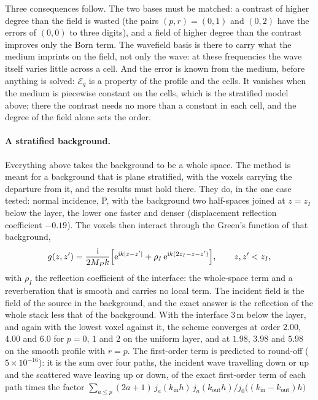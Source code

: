 \documentclass[11pt,a4paper]{article}
\begin{document}
Three consequences follow. The two bases must be matched: a contrast of higher degree than the field is
wasted (the pairs $(p,r)=(0,1)$ and $(0,2)$ have the errors of $(0,0)$ to three digits), and a field of
higher degree than the contrast improves only the Born term. The wavefield basis is there to carry what
the medium imprints on the field, not only the wave: at these frequencies the wave itself varies little
across a cell. And the error is known from the medium, before anything is solved: $\mathcal{E}_q$ is a
property of the profile and the cells. It vanishes when the medium is piecewise constant on the cells,
which is the stratified model above; there the contrast needs no more than a constant in each cell, and
the degree of the field alone sets the order.

\paragraph{A stratified background.} Everything above takes the background to be a whole space. The
method is meant for a background that is plane stratified, with the voxels carrying the departure from
it, and the results must hold there. They do, in the one case tested: normal incidence, P, with the
background two half-spaces joined at $z=z_I$ below the layer, the lower one faster and denser
(displacement reflection coefficient $-0.19$). The voxels then interact through the Green's function
of that background,
\begin{equation}\label{eq:gstrat}
  g(z,z')=\frac{\mathrm{i}}{2M_Pk}\Bigl[\mathrm{e}^{\mathrm{i}k|z-z'|}
          +\rho_I\,\mathrm{e}^{\mathrm{i}k(2z_I-z-z')}\Bigr],\qquad z,z'<z_I,
\end{equation}
with $\rho_I$ the reflection coefficient of the interface: the whole-space term and a reverberation
that is smooth and carries no local term. The incident field is the field of the source in the
background, and the exact answer is the reflection of the whole stack less that of the background.
With the interface $3$\,m below the layer, and again with the lowest voxel against it, the scheme
converges at order $2.00$, $4.00$ and $6.0$ for $p=0$, $1$ and $2$ on the uniform layer, and at
$1.98$, $3.98$ and $5.98$ on the smooth profile with $r=p$. The first-order term is predicted to
round-off ($5\times10^{-16}$): it is the sum over four paths, the incident wave travelling down or up
and the scattered wave leaving up or down, of the exact first-order term of each path times the factor
$\sum_{a\le p}(2a+1)\,j_a(k_{\mathrm{in}}h)\,j_a(k_{\mathrm{out}}h)/j_0\bigl((k_{\mathrm{in}}-k_{\mathrm{out}})h\bigr)$
\end{document}
